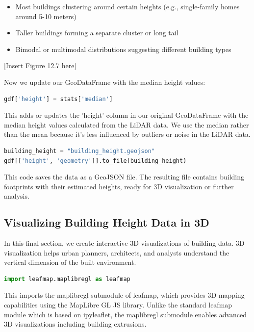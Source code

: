\begin{itemize}
\item Most buildings clustering around certain heights (e.g., single-family homes around 5-10 meters)
\item Taller buildings forming a separate cluster or long tail
\item Bimodal or multimodal distributions suggesting different building types
\end{itemize}

[Insert Figure 12.7 here]

Now we update our GeoDataFrame with the median height values:

\begin{lstlisting}[language=Python]
gdf['height'] = stats['median']
\end{lstlisting}

This adds or updates the 'height' column in our original GeoDataFrame with the median height values calculated from the LiDAR data. We use the median rather than the mean because it's less influenced by outliers or noise in the LiDAR data.

\begin{lstlisting}[language=Python]
building_height = "building_height.geojson"
gdf[['height', 'geometry']].to_file(building_height)
\end{lstlisting}

This code saves the data as a GeoJSON file. The resulting file contains building footprints with their estimated heights, ready for 3D visualization or further analysis.

\subsection{Visualizing Building Height Data in 3D}

In this final section, we create interactive 3D visualizations of building data. 3D visualization helps urban planners, architects, and analysts understand the vertical dimension of the built environment.

\begin{lstlisting}[language=Python]
import leafmap.maplibregl as leafmap
\end{lstlisting}

This imports the maplibregl submodule of leafmap, which provides 3D mapping capabilities using the MapLibre GL JS library. Unlike the standard leafmap module which is based on ipyleaflet, the maplibregl submodule enables advanced 3D visualizations including building extrusions.

